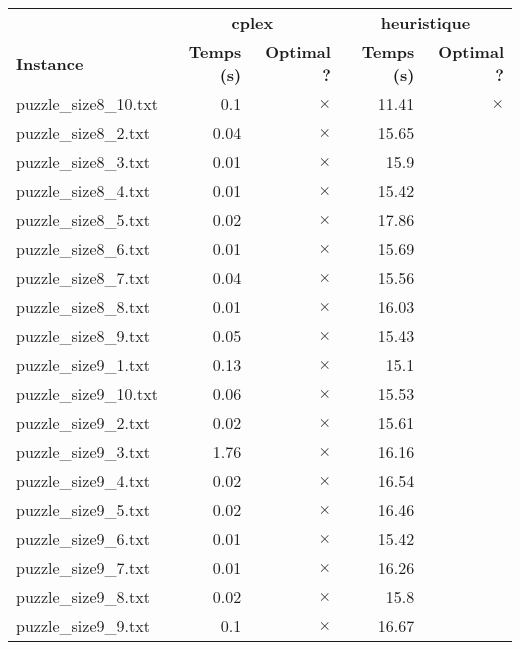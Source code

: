 \documentclass{article}
\begin{document}
\newpage
\begin{center}
\renewcommand{\arraystretch}{1.4} 
\begin{tabular}{lrrrr}
	\hline
 & \multicolumn{2}{c}{\textbf{cplex}} & \multicolumn{2}{c}{\textbf{heuristique}}\\
\textbf{Instance}  & \textbf{Temps (s)} & \textbf{Optimal ?}  & \textbf{Temps (s)} & \textbf{Optimal ?} \\\hline

puzzle\_size8\_10.txt & 0.1 & 
$\times$
 & 11.41 & 
$\times$
\\
puzzle\_size8\_2.txt & 0.04 & 
$\times$
 & 15.65 & 
\\
puzzle\_size8\_3.txt & 0.01 & 
$\times$
 & 15.9 & 
\\
puzzle\_size8\_4.txt & 0.01 & 
$\times$
 & 15.42 & 
\\
puzzle\_size8\_5.txt & 0.02 & 
$\times$
 & 17.86 & 
\\
puzzle\_size8\_6.txt & 0.01 & 
$\times$
 & 15.69 & 
\\
puzzle\_size8\_7.txt & 0.04 & 
$\times$
 & 15.56 & 
\\
puzzle\_size8\_8.txt & 0.01 & 
$\times$
 & 16.03 & 
\\
puzzle\_size8\_9.txt & 0.05 & 
$\times$
 & 15.43 & 
\\
puzzle\_size9\_1.txt & 0.13 & 
$\times$
 & 15.1 & 
\\
puzzle\_size9\_10.txt & 0.06 & 
$\times$
 & 15.53 & 
\\
puzzle\_size9\_2.txt & 0.02 & 
$\times$
 & 15.61 & 
\\
puzzle\_size9\_3.txt & 1.76 & 
$\times$
 & 16.16 & 
\\
puzzle\_size9\_4.txt & 0.02 & 
$\times$
 & 16.54 & 
\\
puzzle\_size9\_5.txt & 0.02 & 
$\times$
 & 16.46 & 
\\
puzzle\_size9\_6.txt & 0.01 & 
$\times$
 & 15.42 & 
\\
puzzle\_size9\_7.txt & 0.01 & 
$\times$
 & 16.26 & 
\\
puzzle\_size9\_8.txt & 0.02 & 
$\times$
 & 15.8 & 
\\
puzzle\_size9\_9.txt & 0.1 & 
$\times$
 & 16.67 & 
\\
\hline\end{tabular}
\end{center}
\end{document}
